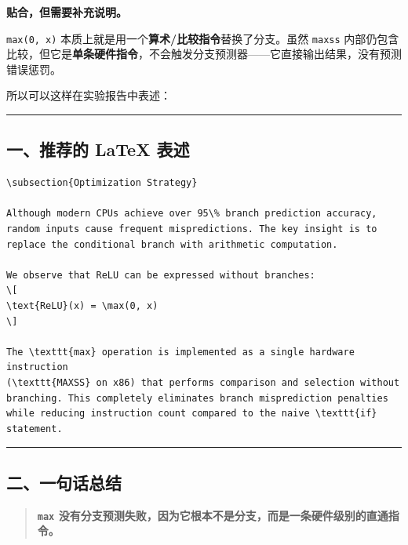 \documentclass[11pt, a4paper]{article}
\begin{document}
\begin{aibox}
\textbf{贴合，但需要补充说明。}

\texttt{max(0, x)} 本质上就是用一个\textbf{算术/比较指令}替换了分支。虽然 \texttt{maxss} 内部仍包含比较，但它是\textbf{单条硬件指令}，不会触发分支预测器——它直接输出结果，没有预测错误惩罚。

所以可以这样在实验报告中表述：

\begin{center}\rule{\textwidth}{0.4pt}\end{center}

\subsection*{一、推荐的 LaTeX 表述}

\begin{tcolorbox}[colback=white,colframe=gray!50!white,boxrule=0.5pt,arc=2pt,left=5pt,right=5pt,top=5pt,bottom=5pt]
\begin{verbatim}
\subsection{Optimization Strategy}

Although modern CPUs achieve over 95\% branch prediction accuracy, 
random inputs cause frequent mispredictions. The key insight is to 
replace the conditional branch with arithmetic computation.

We observe that ReLU can be expressed without branches:
\[
\text{ReLU}(x) = \max(0, x)
\]

The \texttt{max} operation is implemented as a single hardware instruction 
(\texttt{MAXSS} on x86) that performs comparison and selection without 
branching. This completely eliminates branch misprediction penalties 
while reducing instruction count compared to the naive \texttt{if} statement.
\end{verbatim}
\end{tcolorbox}

\begin{center}\rule{\textwidth}{0.4pt}\end{center}

\subsection*{二、一句话总结}

\begin{quote}
\textbf{\texttt{max} 没有分支预测失败，因为它根本不是分支，而是一条硬件级别的直通指令。}
\end{quote}
\end{aibox}
\end{document}
